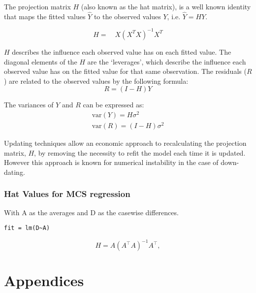 \documentclass[12pt, a4paper]{article}
\begin{document}
The projection matrix $H$ (also known as the hat matrix), is a
well known identity that maps the fitted values $\hat{Y}$ to the
observed values $Y$, i.e. $\hat{Y} = HY$.


\begin{equation}
H =\quad X(X^{T}X)^{-1}X^{T}
\end{equation}


$H$ describes the influence each observed value has on each fitted value. The diagonal elements of the $H$ are the `leverages', which describe the influence each observed value has on the fitted value for that same observation. The residuals ($R$) are related to the observed values by the following formula:
\begin{equation}
R = (I-H)Y
\end{equation}


The variances of $Y$ and $R$ can be expressed as:
\begin{eqnarray}
\mbox{var}(Y) = H\sigma^{2} \nonumber\\
\mbox{var}(R) = (I-H)\sigma^{2}
\end{eqnarray}


Updating techniques allow an economic approach to recalculating the projection matrix, $H$, by removing the necessity to refit the model each time it is updated. However this approach is known for
numerical instability in the case of down-dating.






\subsection{Hat Values for MCS regression}


With A as the averages and D as the casewise differences.
\begin{verbatim}
fit = lm(D~A)
\end{verbatim}


\begin{displaymath}
H = A \left(A^\top  A\right)^{-1} A^\top ,
\end{displaymath}

\newpage



\chapter{Appendices} %
\newpage
\end{document}
